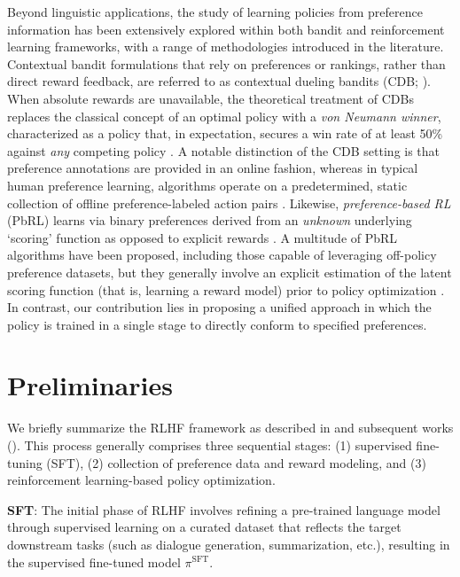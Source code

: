 Beyond linguistic applications, the study of learning policies from preference information has been extensively explored within both bandit and reinforcement learning frameworks, with a range of methodologies introduced in the literature. Contextual bandit formulations that rely on preferences or rankings, rather than direct reward feedback, are referred to as contextual dueling bandits (CDB; \cite{yue2012karmed,dudik2015contextual}). When absolute rewards are unavailable, the theoretical treatment of CDBs replaces the classical concept of an optimal policy with a \textit{von Neumann winner}, characterized as a policy that, in expectation, secures a win rate of at least 50\% against \textit{any} competing policy \citep{dudik2015contextual}. A notable distinction of the CDB setting is that preference annotations are provided in an online fashion, whereas in typical human preference learning, algorithms operate on a predetermined, static collection of offline preference-labeled action pairs \citep{yan2022human}. Likewise, \textit{preference-based RL} (PbRL) learns via binary preferences derived from an \textit{unknown} underlying ‘scoring’ function as opposed to explicit rewards \citep{BusaFekete2014,ruiz2023dueling}. A multitude of PbRL algorithms have been proposed, including those capable of leveraging off-policy preference datasets, but they generally involve an explicit estimation of the latent scoring function (that is, learning a reward model) prior to policy optimization \citep{jain2013learning,BusaFekete2014,christiano2017deep,sadigh2017active,kupcsik2018learning}. In contrast, our contribution lies in proposing a unified approach in which the policy is trained in a single stage to directly conform to specified preferences.

\section{Preliminaries}\label{section:prelims}

We briefly summarize the RLHF framework as described in \citeauthor{ziegler2020finetuning} and subsequent works (\citep{stiennon2022learning, bai2022training, ouyang2022training}). This process generally comprises three sequential stages: (1) supervised fine-tuning (SFT), (2) collection of preference data and reward modeling, and (3) reinforcement learning-based policy optimization.

\textbf{SFT}: The initial phase of RLHF involves refining a pre-trained language model through supervised learning on a curated dataset that reflects the target downstream tasks (such as dialogue generation, summarization, etc.), resulting in the supervised fine-tuned model $\pi^\text{SFT}$.

